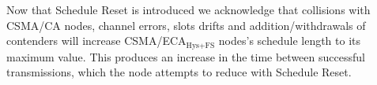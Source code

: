 \documentclass[]{article}
\begin{document}
		Now that Schedule Reset is introduced we acknowledge that collisions with CSMA/CA nodes, channel errors, slots drifts and addition/withdrawals of contenders will increase CSMA/ECA$_{\text{Hys+FS}}$ nodes's schedule length to its maximum value. This produces an increase in the time between successful transmissions, which the node attempts to reduce with Schedule Reset.
		
%		
		


\end{document}
